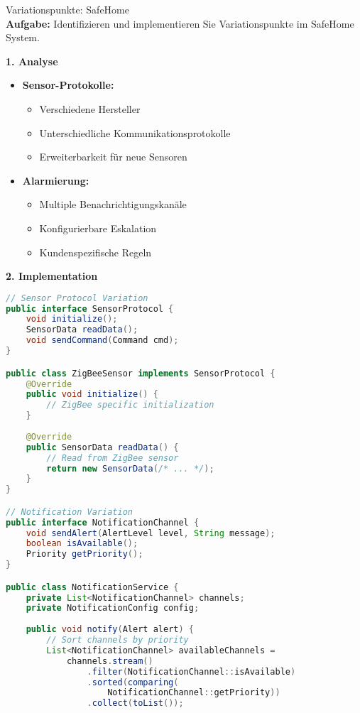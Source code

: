 \begin{example2}[breakable][breakable]{Variationspunkte: SafeHome}\\
\textbf{Aufgabe:} Identifizieren und implementieren Sie Variationspunkte im SafeHome System.

\textbf{1. Analyse}
\begin{itemize}
    \item \textbf{Sensor-Protokolle:}
    \begin{itemize}
        \item Verschiedene Hersteller
        \item Unterschiedliche Kommunikationsprotokolle
        \item Erweiterbarkeit für neue Sensoren
    \end{itemize}
    
    \item \textbf{Alarmierung:}
    \begin{itemize}
        \item Multiple Benachrichtigungskanäle
        \item Konfigurierbare Eskalation
        \item Kundenspezifische Regeln
    \end{itemize}
\end{itemize}

\textbf{2. Implementation}
\begin{lstlisting}[language=Java, style=basesmol]
// Sensor Protocol Variation
public interface SensorProtocol {
    void initialize();
    SensorData readData();
    void sendCommand(Command cmd);
}

public class ZigBeeSensor implements SensorProtocol {
    @Override
    public void initialize() {
        // ZigBee specific initialization
    }
    
    @Override
    public SensorData readData() {
        // Read from ZigBee sensor
        return new SensorData(/* ... */);
    }
}

// Notification Variation
public interface NotificationChannel {
    void sendAlert(AlertLevel level, String message);
    boolean isAvailable();
    Priority getPriority();
}

public class NotificationService {
    private List<NotificationChannel> channels;
    private NotificationConfig config;
    
    public void notify(Alert alert) {
        // Sort channels by priority
        List<NotificationChannel> availableChannels = 
            channels.stream()
                .filter(NotificationChannel::isAvailable)
                .sorted(comparing(
                    NotificationChannel::getPriority))
                .collect(toList());
                

\end{lstlisting}
\end{example2}
